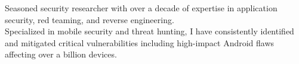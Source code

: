 \documentclass[10pt,a4paper,ragged2e,withhyper]{altacv}
\begin{document}


\makecvheader

\begin{center}
\small
\textcolor{body}{Seasoned security researcher with over a decade of expertise in application security, red teaming, and reverse engineering.\\Specialized in mobile security and threat hunting, I have consistently identified and mitigated critical vulnerabilities including high-impact Android flaws affecting over a billion devices.}
\end{center}

\end{document}
